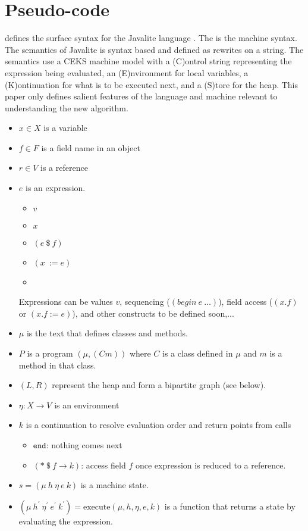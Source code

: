 \section{Pseudo-code}
 defines the surface syntax for the
Javalite language \cite{saints-MS}. The  is
the machine syntax. The semantics of Javalite is syntax based and
defined as rewrites on a string. The semantics use a CEKS machine
model with a (C)ontrol string representing the expression being
evaluated, an (E)nvironment for local variables, a (K)ontinuation for
what is to be executed next, and a (S)tore for the heap. This paper
only defines salient features of the language and machine relevant to
understanding the new algorithm.




\begin{itemize}
\item $x \in X$ is a variable
\item $f\in F$ is a field name in an object
\item $r\in V$ is a reference
\item $e$ is an expression.
  \begin{itemize}
  \item $v$
  \item $x$
  \item $(e\ \$\ f)$
  \item $(x\ := e)$
  \item
  \end{itemize} Expressions can be values $v$, sequencing
  ($(begin\ e\ \ldots)$), field access ($(x.f)$ or $(x.f := e)$), and
  other constructs to be defined soon,...
\item $\mu$ is the text that defines classes and methods.
\item $P$ is a program $(\mu, (C m))$ where $C$ is a class defined in
  $\mu$ and $m$ is a method in that class.
\item $(L,R)$ represent the heap and form a bipartite graph (see below).
\item $\eta : X \rightarrow V$ is an environment
\item $k$ is a continuation to resolve evaluation order and return points from calls
\begin{itemize}
\item $\mathtt{end}$: nothing comes next
\item $(*\ \$\ f \rightarrow k)$: access field $f$ once expression is reduced to a reference.
\end{itemize}
\item $s = (\mu\ h\ \eta\ e\ k)$ is a machine state.
\item $(\mu\ h^\prime\ \eta^\prime\ e^\prime\ k^\prime) =
  \mathrm{execute}(\mu, h, \eta, e, k)$ is a function that returns a
  state by evaluating the expression.
\end{itemize}

